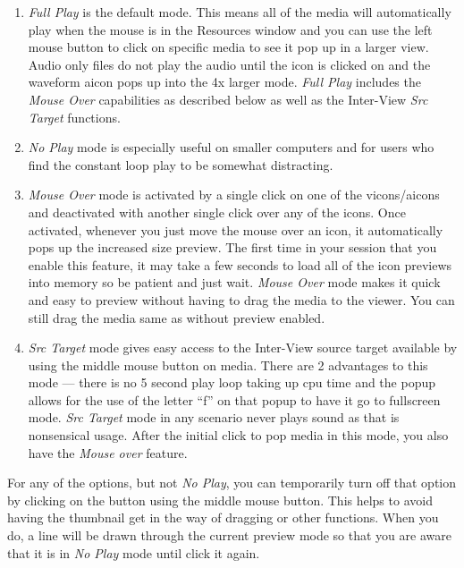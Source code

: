 \begin{enumerate}
    \item  \emph{Full Play} is the default mode.  
        This means all of the media will automatically play when the mouse is in the Resources window and you can use the left mouse button to click on specific media to see it pop up in a larger view.  
        Audio only files do not play the audio until the icon is clicked on and the waveform aicon pops up into the 4x larger mode. 
        \emph{Full Play} includes the \emph{Mouse Over} capabilities as described below as well as the Inter-View \emph{Src Target} functions.

\item  \emph{No Play} mode is especially useful on smaller computers and for users who find the constant loop play to be somewhat distracting.

\item  \emph{Mouse Over} mode is activated by a single click on one of the vicons/aicons and deactivated with another single click over any of the icons.  
    Once activated, whenever you just move the mouse over an icon, it automatically pops up the increased size preview.  
    The first time in your session that you enable this feature, it may take a few seconds to load all of the icon previews into memory so be patient and just wait.  
    \emph{Mouse Over} mode makes it quick and easy to preview without having to drag the media to the viewer.  
    You can still drag the media same as without preview enabled.  

\item  \emph{Src Target} mode gives easy access to the Inter-View source target available by using the middle mouse button on media.  
    There are 2 advantages to this mode --- there is no 5 second play loop taking up cpu time and the popup allows for the use of the letter “f” on that popup to have it go to fullscreen mode.  
    \emph{Src Target} mode in any scenario never plays sound as that is nonsensical usage.  
    After the initial click to pop media in this mode, you also have the \emph{Mouse over} feature.
\end{enumerate}

For any of the options, but not \emph{No Play}, you can temporarily turn off that option by clicking on the button using the middle mouse button.  
This helps to avoid having the thumbnail get in the way of dragging or other functions.  
When you do, a line will be drawn through the current preview mode so that you are aware that it is in \emph{No Play} mode until click it again.

